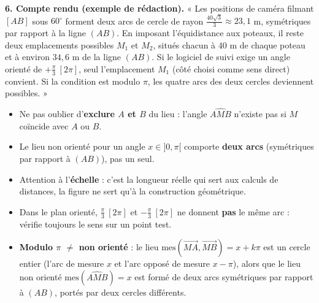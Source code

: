 \documentclass[11pt]{article}
\newcounter{popsec}
\newcounter{popsub}
\newcommand{\courssub}[1]{%
  \stepcounter{popsub}%
  \par\vspace{9pt}\noindent{\popxbold\fontsize{11.5}{13}\selectfont\color{popink}{\color{poporange}\thepopsec.\thepopsub}\hspace{6pt}#1}\par\nopagebreak\vspace{4pt}
}
\begin{document}
\begin{exoresolu}
\textbf{6. Compte rendu (exemple de rédaction).} « Les positions de caméra filmant $[AB]$ sous $60^{\circ}$ forment deux arcs de cercle de rayon $\frac{40\sqrt{3}}{3} \approx 23{,}1$ m, symétriques par rapport à la ligne $(AB)$. En imposant l'équidistance aux poteaux, il reste deux emplacements possibles $M_1$ et $M_2$, situés chacun à $40$ m de chaque poteau et à environ $34{,}6$ m de la ligne $(AB)$. Si le logiciel de suivi exige un angle orienté de $+\frac{\pi}{3}\ [2\pi]$, seul l'emplacement $M_1$ (côté choisi comme sens direct) convient. Si la condition est modulo $\pi$, les quatre arcs des deux cercles deviennent possibles. »
\end{exoresolu}

\begin{attention}
\begin{itemize}
\item Ne pas oublier d'\textbf{exclure $A$ et $B$} du lieu : l'angle $\widehat{AMB}$ n'existe pas si $M$ coïncide avec $A$ ou $B$.
\item Le lieu non orienté pour un angle $x\in]0,\pi[$ comporte \textbf{deux arcs} (symétriques par rapport à $(AB)$), pas un seul.
\item Attention à l'\textbf{échelle} : c'est la longueur réelle qui sert aux calculs de distances, la figure ne sert qu'à la construction géométrique.
\item Dans le plan orienté, $\frac{\pi}{3}\ [2\pi]$ et $-\frac{\pi}{3}\ [2\pi]$ ne donnent \textbf{pas} le même arc : vérifie toujours le sens sur un point test.
\item \textbf{Modulo $\pi$ $\neq$ non orienté} : le lieu $\mathrm{mes}(\overrightarrow{MA},\overrightarrow{MB}) = x + k\pi$ est un cercle entier (l'arc de mesure $x$ et l'arc opposé de mesure $x-\pi$), alors que le lieu non orienté $\mathrm{mes}(\widehat{AMB})=x$ est formé de deux arcs symétriques par rapport à $(AB)$, portés par deux cercles différents.
\end{itemize}
\end{attention}

\courssub{Bilan de l'activité}
\end{document}
